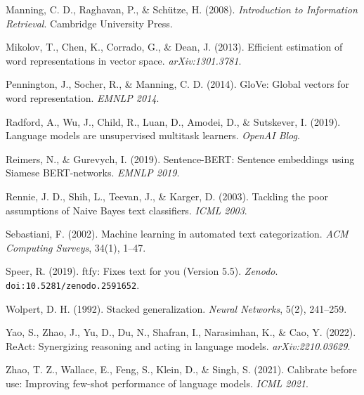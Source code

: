 \documentclass[11pt,a4paper]{article}
\begin{document}
{Manning, C. D., Raghavan, P., \& Sch\"utze, H. (2008). \emph{Introduction to Information Retrieval}.
Cambridge University Press.

Mikolov, T., Chen, K., Corrado, G., \& Dean, J. (2013). Efficient estimation of word representations
in vector space. \emph{arXiv:1301.3781}.

Pennington, J., Socher, R., \& Manning, C. D. (2014). GloVe: Global vectors for word representation.
\emph{EMNLP 2014}.

Radford, A., Wu, J., Child, R., Luan, D., Amodei, D., \& Sutskever, I. (2019). Language models are
unsupervised multitask learners. \emph{OpenAI Blog}.

Reimers, N., \& Gurevych, I. (2019). Sentence-BERT: Sentence embeddings using Siamese BERT-networks.
\emph{EMNLP 2019}.

Rennie, J. D., Shih, L., Teevan, J., \& Karger, D. (2003). Tackling the poor assumptions of Naive
Bayes text classifiers. \emph{ICML 2003}.

Sebastiani, F. (2002). Machine learning in automated text categorization. \emph{ACM Computing
Surveys}, 34(1), 1--47.

Speer, R. (2019). ftfy: Fixes text for you (Version 5.5). \emph{Zenodo}.
\texttt{doi:10.5281/zenodo.2591652}.

Wolpert, D. H. (1992). Stacked generalization. \emph{Neural Networks}, 5(2), 241--259.

Yao, S., Zhao, J., Yu, D., Du, N., Shafran, I., Narasimhan, K., \& Cao, Y. (2022). ReAct:
Synergizing reasoning and acting in language models. \emph{arXiv:2210.03629}.

Zhao, T. Z., Wallace, E., Feng, S., Klein, D., \& Singh, S. (2021). Calibrate before use: Improving
few-shot performance of language models. \emph{ICML 2021}.
}
\end{document}
